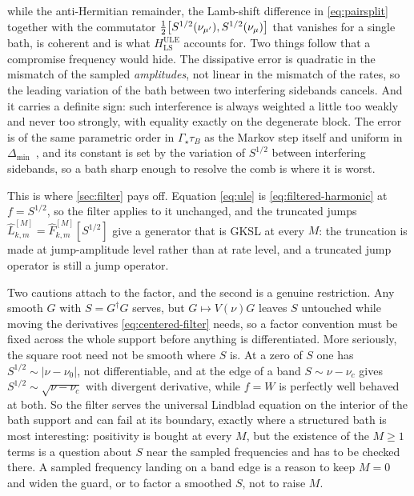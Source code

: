 \documentclass[a4paper,11pt]{article}
\begin{document}
while the anti-Hermitian remainder, the Lamb-shift difference in \eqref{eq:pairsplit} together with the commutator $\tfrac12\comm{S^{1/2}(\nu_{\mu'})}{S^{1/2}(\nu_\mu)}$ that vanishes for a single bath, is coherent and is what $H^{\mathrm{ULE}}_{\mathrm{LS}}$ accounts for. Two things follow that a compromise frequency would hide. The dissipative error is quadratic in the mismatch of the sampled \emph{amplitudes}, not linear in the mismatch of the rates, so the leading variation of the bath between two interfering sidebands cancels. And it carries a definite sign: such interference is always weighted a little too weakly and never too strongly, with equality exactly on the degenerate block. The error is of the same parametric order in $\Gamma_{\!\star}\tau_B$ as the Markov step itself and uniform in $\Delta_{\min}$~\cite{Nathan2020Universal,Ikeuchi2025Error}, and its constant is set by the variation of $S^{1/2}$ between interfering sidebands, so a bath sharp enough to resolve the comb is where it is worst.


This is where \cref{sec:filter} pays off. Equation \eqref{eq:ule} is \eqref{eq:filtered-harmonic} at $f = S^{1/2}$, so the filter applies to it unchanged, and the truncated jumps $\hat L^{[M]}_{k,m} = \hat F^{[M]}_{k,m}[S^{1/2}]$ give a generator that is GKSL at every $M$: the truncation is made at jump-amplitude level rather than at rate level, and a truncated jump operator is still a jump operator.

Two cautions attach to the factor, and the second is a genuine restriction. Any smooth $G$ with $S = G^\dagger G$ serves, but $G \mapsto V(\nu)G$ leaves $S$ untouched while moving the derivatives \eqref{eq:centered-filter} needs, so a factor convention must be fixed across the whole support before anything is differentiated. More seriously, the square root need not be smooth where $S$ is. At a zero of $S$ one has $S^{1/2}\sim\lvert\nu-\nu_0\rvert$, not differentiable, and at the edge of a band $S\sim\nu-\nu_c$ gives $S^{1/2}\sim\sqrt{\nu-\nu_c}$ with divergent derivative, while $f = W$ is perfectly well behaved at both. So the filter serves the universal Lindblad equation on the interior of the bath support and can fail at its boundary, exactly where a structured bath is most interesting: positivity is bought at every $M$, but the existence of the $M\ge1$ terms is a question about $S$ near the sampled frequencies and has to be checked there. A sampled frequency landing on a band edge is a reason to keep $M=0$ and widen the guard, or to factor a smoothed $S$, not to raise $M$.
\end{document}
